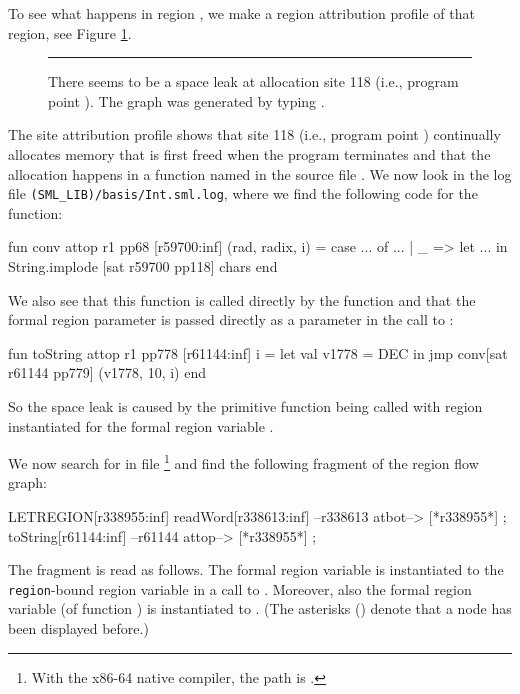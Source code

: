 \documentclass[12pt]{book}
\begin{document}
To see what happens in region , we make a region attribution
profile of that region, see Figure \ref{scan_rev1_r.fig}.
\begin{figure}
\caption{There seems to be a space leak at allocation site 118 (i.e., program point ). The graph
  was generated by typing
  .}
\label{scan_rev1_r.fig}
\medskip\hrule
\end{figure}
The site attribution profile shows that site 118 (i.e., program point ) continually
allocates memory that is first freed when the program terminates and that the
allocation happens in a function named  in the source file
. We now look in the log file
\kw{\$}\lstinline{(SML_LIB)/basis/Int.sml.log}, where we find the following code for the
 function:
\begin{smlcode}
  fun conv attop r1 pp68 [r59700:inf] (rad, radix, i) =
    case ... of ...
    | _ =>
      let ...
      in String.implode [sat r59700 pp118] chars
      end
\end{smlcode}
We also see that this function is called directly by the function
 and that the formal region parameter  is passed
directly as a parameter in the call to :
\begin{smlcode}
  fun toString attop r1 pp778 [r61144:inf] i =
    let val v1778 = DEC
    in jmp conv[sat r61144 pp779] (v1778, 10, i)
    end
\end{smlcode}
So the space leak is caused by the  primitive function being
called with region  instantiated for the formal region variable
.

We now search for  in file
\footnote{With the x86-64 native
compiler, the path is .} and find the
following fragment of the region flow graph:
\begin{small}
\begin{scriptcode}
  LETREGION[r338955:inf]
  readWord[r338613:inf]   --r338613 atbot-->   [*r338955*] ;
  toString[r61144:inf]   --r61144 attop-->   [*r338955*] ;
\end{scriptcode}
\end{small}
The fragment is read as follows. The formal region variable  is
instantiated to the \lstinline{region}-bound region variable  in a
call to . Moreover, also the formal region variable 
(of function ) is instantiated to . (The asterisks
(\kw{*}) denote that a node has been displayed before.)
\end{document}

